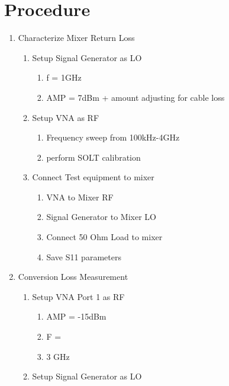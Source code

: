 \documentclass[journal]{IEEEtran}
\begin{document}
\section{Procedure}
\begin{enumerate}
    \item Characterize Mixer Return Loss
          \begin{enumerate}
              \item Setup Signal Generator as LO
                    \begin{enumerate}
                        \item f = 1GHz
                        \item AMP = 7dBm + amount adjusting for cable loss
                    \end{enumerate}
              \item Setup VNA as RF
                    \begin{enumerate}
                        \item Frequency sweep from 100kHz-4GHz
                        \item perform SOLT calibration
                    \end{enumerate}
              \item Connect Test equipment to mixer
                    \begin{enumerate}
                        \item VNA to Mixer RF
                        \item Signal Generator to Mixer LO
                        \item Connect 50 Ohm Load to mixer
                        \item Save S11 parameters
                    \end{enumerate}
          \end{enumerate}
    \item Conversion Loss Measurement
          \begin{enumerate}
              \item Setup VNA Port 1 as RF
                    \begin{enumerate}
                        \item AMP = -15dBm
                        \item F = \item3 GHz
                    \end{enumerate}
              \item Setup Signal Generator as LO
                    \begin{enumerate}

\end{enumerate}
\end{enumerate}
\end{enumerate}
\end{document}
